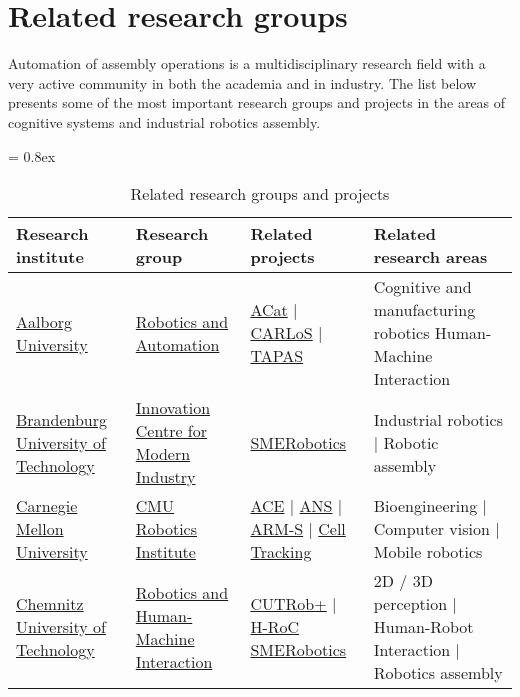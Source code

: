 \section{Related research groups}

Automation of assembly operations is a multidisciplinary research field with a very active community in both the academia and in industry. The list below presents some of the most important research groups and projects in the areas of cognitive systems and industrial robotics assembly.

\begin{table}[H]
	\caption{Related research groups and projects}
	\tabulinesep = 0.8ex
	\centering
	\scriptsize
	\begin{tabu} { X[m,c] X[0.9,m,c] X[1.2,m,c] X[1.8,m,c] }
		\rowfont{\bfseries\itshape} Research institute & Research group & Related projects & Related research areas \\
		\hline
		\href{http://www.en.aau.dk}{Aalborg University} &
		\href{http://robotics-automation.aau.dk}{Robotics and Automation} &
		\href{http://www.acat-project.eu/}{ACat} | \href{http://carlosproject.eu/}{CARLoS} | \href{http://tapas-project.eu/}{TAPAS} &
		Cognitive and manufacturing robotics Human-Machine Interaction \\

		\tabucline[1pt on 1.5pt off 3pt]{-}
		\href{https://www.b-tu.de/en}{Brandenburg University of Technology} &
		\href{https://www.b-tu.de/en/research/research-projects/innovation-center-modern-industry-brandenburg}{Innovation Centre for Modern Industry} &
		\href{http://www.smerobotics.org/AUTOMATICA/exhibit-06-2016.html}{SMERobotics} &
		Industrial robotics | Robotic assembly \\

		\tabucline[1pt on 1.5pt off 3pt]{-}
		\href{http://www.cmu.edu}{Carnegie Mellon University} &
		\href{https://www.ri.cmu.edu}{CMU Robotics Institute} &
		\href{http://www.frc.ri.cmu.edu/projects/ace}{ACE} | \href{https://www.ri.cmu.edu/research_project_detail.html?project_id=550\&menu_id=261}{ANS} | \href{http://www.nrec.ri.cmu.edu/projects/arms}{ARM-S} | \href{https://www.ri.cmu.edu/research_project_detail.html?project_id=579\&menu_id=261}{Cell Tracking} &
		Bioengineering | Computer vision | Mobile robotics \\

		\tabucline[1pt on 1.5pt off 3pt]{-}
		\href{https://www.tu-chemnitz.de}{Chemnitz University of Technology} &
		\href{https://www.tu-chemnitz.de/etit/robosys/index.php.en}{Robotics and Human-Machine Interaction} &
		\href{http://www.euroc-project.eu/index.php?id=challenger_cutrob}{CUTRob+} | \href{http://www.drematrix.de/projects/hroc-human-robot-cooperation/}{H-RoC} \href{http://www.smerobotics.org/AUTOMATICA/exhibit-02-2016.html}{SMERobotics} &
		2D / 3D perception | Human-Robot Interaction | Robotics assembly \\


\end{tabu}
\end{table}
